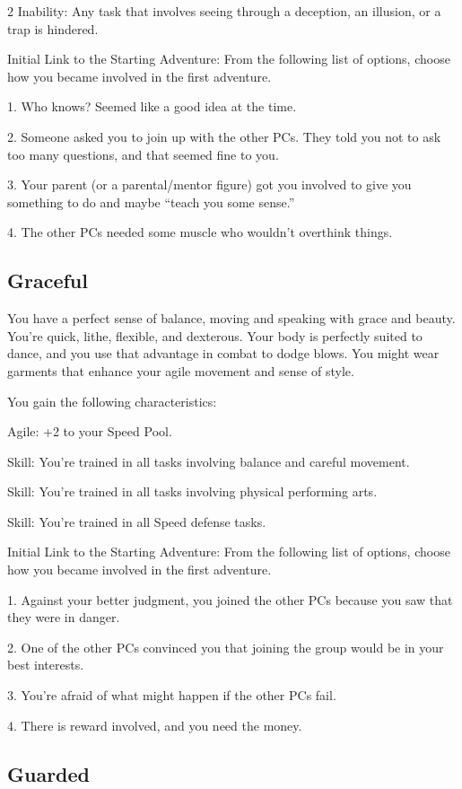 \begin{multicols}{2}
Inability: Any task that involves seeing through a deception, an illusion, or a trap is hindered.

Initial Link to the Starting Adventure: From the following list of options, choose how you became involved in the first adventure.

1. Who knows? Seemed like a good idea at the time.

2. Someone asked you to join up with the other PCs. They told you not to ask too many questions, and that seemed fine to you.

3. Your parent (or a parental/mentor figure) got you involved to give you something to do and maybe “teach you some sense.”

4. The other PCs needed some muscle who wouldn’t overthink things.

\subsection{Graceful}

You have a perfect sense of balance, moving and speaking with grace and beauty. You’re quick, lithe, flexible, and dexterous. Your body is perfectly suited to dance, and you use that advantage in combat to dodge blows. You might wear garments that enhance your agile movement and sense of style.

You gain the following characteristics:

Agile: +2 to your Speed Pool.

Skill: You’re trained in all tasks involving balance and careful movement.

Skill: You’re trained in all tasks involving physical performing arts.

Skill: You’re trained in all Speed defense tasks.

Initial Link to the Starting Adventure: From the following list of options, choose how you became involved in the first adventure.

1. Against your better judgment, you joined the other PCs because you saw that they were in danger.

2. One of the other PCs convinced you that joining the group would be in your best interests.

3. You’re afraid of what might happen if the other PCs fail.

4. There is reward involved, and you need the money.

\subsection{Guarded}


\end{multicols}
